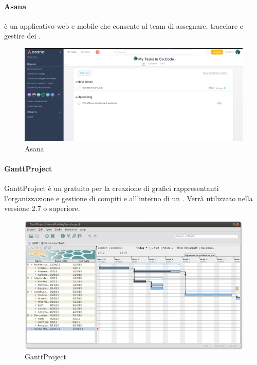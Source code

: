  \paragraph{Asana}
  è un applicativo web e mobile che consente al team di assegnare, tracciare e gestire dei .
\begin{figure}[h]
\centering
\includegraphics[scale=0.4]{img/asana.png}
\caption{Asana}\label{sec:Figura5}
\end{figure}
 \paragraph{GanttProject} 
 GanttProject è un  gratuito per la creazione di grafici rappresentanti l'organizzazione e gestione di compiti e  all'interno di un . Verrà utilizzato nella versione 2.7 o superiore.
\begin{figure}[h]
\centering
\includegraphics[scale=0.35]{img/gantt.png}
\caption{GanttProject}\label{sec:Figura6}
\end{figure} 